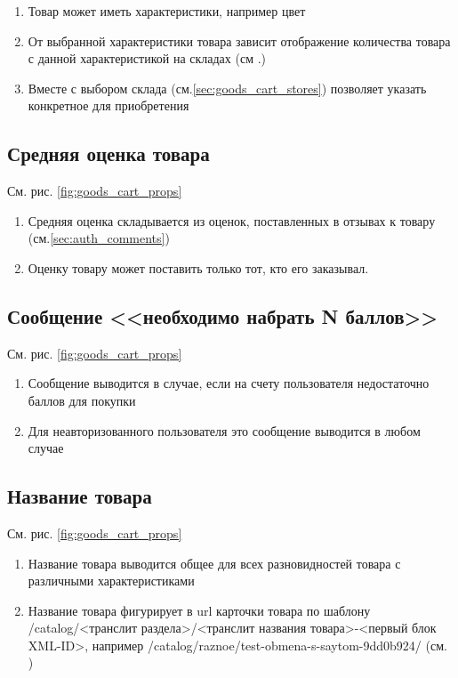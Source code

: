             \begin{enumerate}
                \item Товар может иметь характеристики, например цвет
                \item От выбранной характеристики товара зависит отображение количества товара с данной характеристикой
                    на складах (см .\label{sec:goods_cart_store})
                \item Вместе с выбором склада (см.\ref{sec:goods_cart_stores}) позволяет указать конкретное 
                    для приобретения
            \end{enumerate}
        
        \subsection{Средняя оценка товара}
            См. рис. \ref{fig:goods_cart_props}

            \begin{enumerate}
                \item Средняя оценка складывается из оценок, поставленных в отзывах к товару (см.\ref{sec:auth_comments})
                \item Оценку товару может поставить только тот, кто его заказывал.
            \end{enumerate}

        \subsection{Сообщение <<необходимо набрать N баллов>>}
            См. рис. \ref{fig:goods_cart_props}
            \begin{enumerate}
                \item Сообщение выводится в случае, если на счету пользователя недостаточно баллов для покупки 
                \item Для неавторизованного пользователя это сообщение выводится в любом случае
            \end{enumerate}

        \subsection{Название товара}
            См. рис. \ref{fig:goods_cart_props}
            \begin{enumerate}
                \item Название товара выводится общее для всех разновидностей товара с различными характеристиками 
                \item Название товара фигурирует в url карточки товара по шаблону /catalog/<транслит раздела>/<транслит
                    названия товара>-<первый блок XML-ID>, например /catalog/raznoe/test-obmena-s-saytom-9dd0b924/ (см.
                    )
            \end{enumerate}

